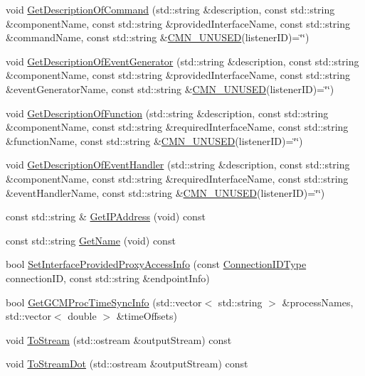 \begin{DoxyCompactItemize}
\item 
void \hyperlink{classmts_manager_local_aa23c882a4d8d12a41c30f6c2e4f008f6}{Get\+Description\+Of\+Command} (std\+::string \&description, const std\+::string \&component\+Name, const std\+::string \&provided\+Interface\+Name, const std\+::string \&command\+Name, const std\+::string \&\hyperlink{cmn_portability_8h_a021894e2626935fa2305434b1e893ff6}{C\+M\+N\+\_\+\+U\+N\+U\+S\+E\+D}(listener\+I\+D)=\char`\"{}\char`\"{})
\item 
void \hyperlink{classmts_manager_local_ab59bb1e128336eb5ef2bcfed753352c3}{Get\+Description\+Of\+Event\+Generator} (std\+::string \&description, const std\+::string \&component\+Name, const std\+::string \&provided\+Interface\+Name, const std\+::string \&event\+Generator\+Name, const std\+::string \&\hyperlink{cmn_portability_8h_a021894e2626935fa2305434b1e893ff6}{C\+M\+N\+\_\+\+U\+N\+U\+S\+E\+D}(listener\+I\+D)=\char`\"{}\char`\"{})
\item 
void \hyperlink{classmts_manager_local_a277e517a00d781ffe9153bf78ae817ee}{Get\+Description\+Of\+Function} (std\+::string \&description, const std\+::string \&component\+Name, const std\+::string \&required\+Interface\+Name, const std\+::string \&function\+Name, const std\+::string \&\hyperlink{cmn_portability_8h_a021894e2626935fa2305434b1e893ff6}{C\+M\+N\+\_\+\+U\+N\+U\+S\+E\+D}(listener\+I\+D)=\char`\"{}\char`\"{})
\item 
void \hyperlink{classmts_manager_local_a2ea56cf917075a58150ac8b301042427}{Get\+Description\+Of\+Event\+Handler} (std\+::string \&description, const std\+::string \&component\+Name, const std\+::string \&required\+Interface\+Name, const std\+::string \&event\+Handler\+Name, const std\+::string \&\hyperlink{cmn_portability_8h_a021894e2626935fa2305434b1e893ff6}{C\+M\+N\+\_\+\+U\+N\+U\+S\+E\+D}(listener\+I\+D)=\char`\"{}\char`\"{})
\item 
const std\+::string \& \hyperlink{classmts_manager_local_adedc9380e7d4563616b271782c04bc6b}{Get\+I\+P\+Address} (void) const 
\item 
const std\+::string \hyperlink{classmts_manager_local_ad8b2c443fc9321e94436a94644818cb5}{Get\+Name} (void) const 
\item 
bool \hyperlink{classmts_manager_local_a70ff8c90812c66e14c6ab0c7c9dfe5a4}{Set\+Interface\+Provided\+Proxy\+Access\+Info} (const \hyperlink{mts_forward_declarations_8h_ad3543bb11742e1766374ec96016d6547}{Connection\+I\+D\+Type} connection\+I\+D, const std\+::string \&endpoint\+Info)
\item 
bool \hyperlink{classmts_manager_local_a367eb7f1d24a84fa9e0e22623444acb8}{Get\+G\+C\+M\+Proc\+Time\+Sync\+Info} (std\+::vector$<$ std\+::string $>$ \&process\+Names, std\+::vector$<$ double $>$ \&time\+Offsets)
\item 
void \hyperlink{classmts_manager_local_aa81364a745fce38a9e924cb09c6166d7}{To\+Stream} (std\+::ostream \&output\+Stream) const 
\item 
void \hyperlink{classmts_manager_local_a29f68a2770a88fe6a2cfd7a0cbdabe14}{To\+Stream\+Dot} (std\+::ostream \&output\+Stream) const 
\end{DoxyCompactItemize}
